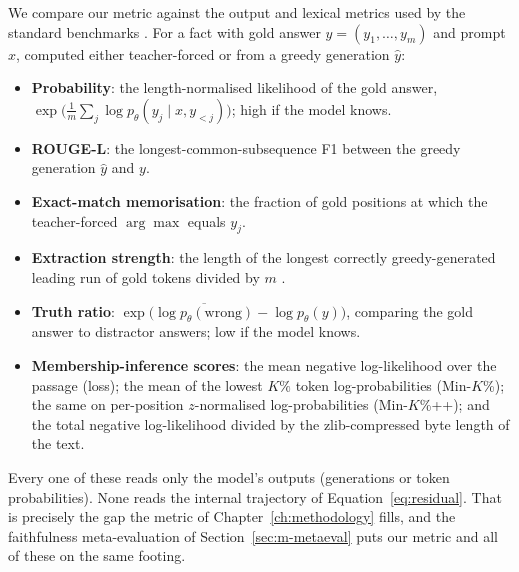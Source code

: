 We compare our metric against the output and lexical metrics used by the standard benchmarks
\citep{maini2024tofu,shi2024muse,li2024wmdp,dorna2025openunlearning}. For a fact with gold answer $y =
(y_1,\dots,y_m)$ and prompt $x$, computed either teacher-forced or from a greedy generation $\hat y$:

\begin{itemize}
  \item \textbf{Probability}: the length-normalised likelihood of the gold answer,
  $\exp\!\bigl(\tfrac{1}{m}\sum_j \log p_\theta(y_j\mid x, y_{<j})\bigr)$; high if the model knows.
  \item \textbf{ROUGE-L}: the longest-common-subsequence F1 between the greedy generation $\hat y$ and $y$.
  \item \textbf{Exact-match memorisation}: the fraction of gold positions at which the teacher-forced
  $\arg\max$ equals $y_j$.
  \item \textbf{Extraction strength}: the length of the longest correctly greedy-generated leading run of
  gold tokens divided by $m$ \citep{carlini2021extracting}.
  \item \textbf{Truth ratio}: $\exp\!\bigl(\overline{\log p_\theta(\text{wrong})} - \log p_\theta(y)\bigr)$,
  comparing the gold answer to distractor answers; low if the model knows.
  \item \textbf{Membership-inference scores}: the mean negative log-likelihood over the passage (loss); the
  mean of the lowest $K\%$ token log-probabilities (Min-$K$\%); the same on per-position $z$-normalised
  log-probabilities (Min-$K$\%++); and the total negative log-likelihood divided by the zlib-compressed
  byte length of the text.
\end{itemize}

Every one of these reads only the model's outputs (generations or token probabilities). None reads the
internal trajectory of Equation~\eqref{eq:residual}. That is precisely the gap the metric of
Chapter~\ref{ch:methodology} fills, and the faithfulness meta-evaluation of Section~\ref{sec:m-metaeval}
puts our metric and all of these on the same footing.
